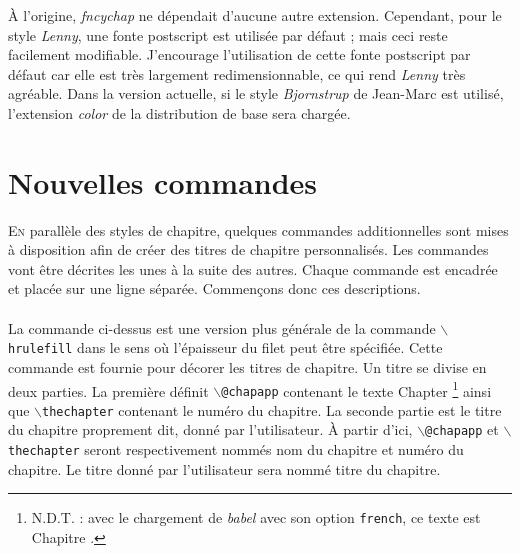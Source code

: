 \documentclass{report}
\newcommand{\sk}{\vspace{0.2 cm}}
\newcommand{\A}[1]{{$\backslash${\tt #1}}}
\newcommand{\nsp}{\mbox{\hspace{-1 cm}}}
\begin{document}
    À l'origine, \textsl{fncychap} ne dépendait d'aucune autre extension. 
    Cependant, pour le style \emph{Lenny}, une fonte postscript est utilisée
    par défaut ; mais ceci reste facilement modifiable. J'encourage 
    l'utilisation de cette fonte postscript par défaut car elle est 
    très largement redimensionnable, ce qui rend \emph{Lenny} 
    très agréable. Dans la version actuelle, si le style \textsl{Bjornstrup}
    de Jean-Marc est utilisé, l'extension \textsl{color} de la distribution de
    base sera chargée. 
    
  \chapter{Nouvelles commandes}
    \lettrine[findent=0.2em,nindent=0em,realheight=true]{E}{n} parallèle des 
    styles de chapitre, quelques commandes additionnelles sont mises à 
    disposition afin de créer des titres de chapitre personnalisés.
    Les commandes vont être décrites les unes à la suite des autres. Chaque
    commande est encadrée et placée sur une ligne séparée. Commençons donc 
    ces descriptions.\sk\\
    \nsp\fbox{\A{mghrulefill}\{{\em épaisseur}\}}\sk\\
    La commande ci-dessus est une version plus générale de la commande
    \A{hrulefill} dans le sens où l'épaisseur du filet peut être spécifiée.
    Cette commande est fournie pour décorer les titres de chapitre. Un
    titre se divise en deux parties. La première définit \A{@chapapp} 
    contenant le texte \og Chapter \fg{}\footnote{N.D.T. : avec le chargement
    de \textsl{babel} avec son option \texttt{french}, ce texte est 
    \og Chapitre \fg{}.} ainsi que \A{thechapter} contenant le numéro du
    chapitre. La seconde partie est le titre du chapitre proprement dit, donné
    par l'utilisateur. À partir d'ici, \A{@chapapp} et \A{thechapter} seront
    respectivement nommés nom du chapitre et numéro du chapitre. Le titre
    donné par l'utilisateur sera nommé titre du chapitre.
\end{document}
